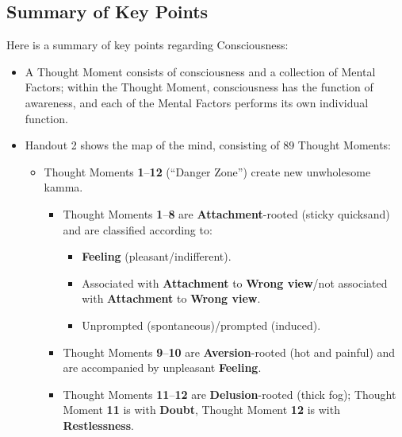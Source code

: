 \subsection*{Summary of Key Points}

Here is a summary of key points regarding Consciousness:

\begin{itemize}

\item A Thought Moment consists of consciousness and a collection of Mental Factors; within the Thought Moment, consciousness has the function of awareness, and each of the Mental Factors performs its own individual function.

\item Handout 2 shows the map of the mind, consisting of 89 Thought Moments:

\begin{itemize}

\item Thought Moments \textbf{1}--\textbf{12} (“Danger Zone”) create new unwholesome kamma.

\begin{itemize}

\item Thought Moments \textbf{1}--\textbf{8} are \textbf{Attachment}-rooted (sticky quicksand) and are classified according to:

\begin{itemize}

\item \textbf{Feeling} (pleasant/indifferent).

\item Associated with \textbf{Attachment} to \textbf{Wrong view}/not associated with \textbf{Attachment} to \textbf{Wrong view}.

\item Unprompted (spontaneous)/prompted (induced).

\end{itemize}

\item Thought Moments \textbf{9}--\textbf{10} are \textbf{Aversion}-rooted (hot and painful) and are accompanied by unpleasant \textbf{Feeling}.

\item Thought Moments \textbf{11}--\textbf{12} are \textbf{Delusion}-rooted (thick fog); Thought Moment \textbf{11} is with \textbf{Doubt}, Thought Moment \textbf{12} is with \textbf{Restlessness}.


\end{itemize}
\end{itemize}
\end{itemize}
